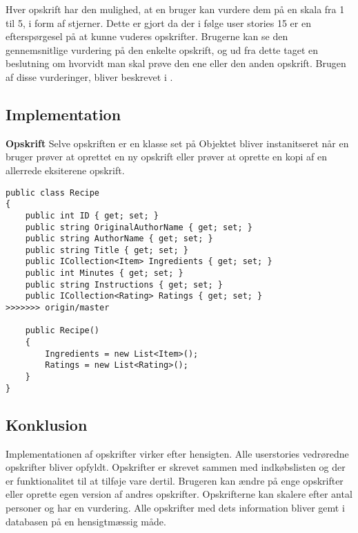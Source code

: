 Hver opskrift har den mulighed, at en bruger kan vurdere dem på en skala fra 1 til 5, i form af stjerner. Dette er gjort da der i følge user stories 15 er en efterspørgesel på at kunne vuderes opskrifter.
Brugerne kan se den gennemsnitlige vurdering på den enkelte opskrift, og ud fra dette taget en beslutning om hvorvidt man skal prøve den ene eller den anden opskrift.
Brugen af disse vurderinger, bliver beskrevet i .


\subsection{Implementation}
\textbf{Opskrift}
Selve opskriften er en klasse set på \myref{} Objektet bliver instanitseret når en bruger prøver at oprettet en ny opskrift eller prøver at oprette en kopi af en allerrede eksiterene opskrift.


\begin{lstlisting}[caption="Klassen Recipe som svarer til objektet\, opskrift"]
public class Recipe
{
    public int ID { get; set; }
    public string OriginalAuthorName { get; set; }
    public string AuthorName { get; set; }
    public string Title { get; set; }
    public ICollection<Item> Ingredients { get; set; }
    public int Minutes { get; set; }
    public string Instructions { get; set; }
    public ICollection<Rating> Ratings { get; set; }
>>>>>>> origin/master

    public Recipe()
    {
        Ingredients = new List<Item>();
        Ratings = new List<Rating>();
    }
}
\end{lstlisting}


\subsection{Konklusion}
Implementationen af opskrifter virker efter hensigten. Alle userstories vedrøredne opskrifter bliver opfyldt. Opskrifter er skrevet sammen med indkøbslisten og der er funktionalitet til at tilføje vare dertil. Brugeren kan ændre på enge opskrifter eller oprette egen version af andres opskrifter. Opskrifterne kan skalere efter antal personer og har en vurdering. Alle opskrifter med dets information bliver gemt i databasen på en hensigtmæssig måde.
